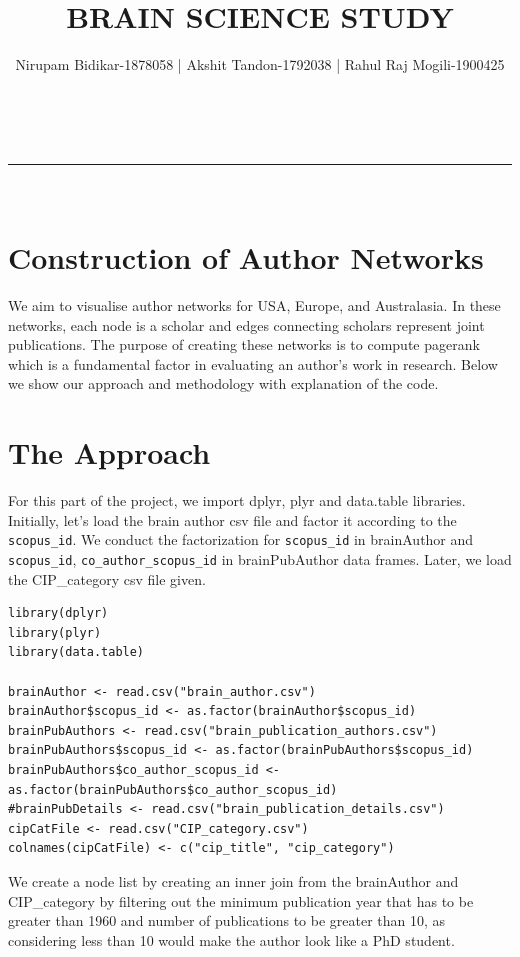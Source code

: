 \documentclass[a4paper,11pt]{article}
\makeatletter
\newcommand{\linia}{\rule{\linewidth}{0.5pt}}
\theoremstyle{mytheor}
\renewcommand{\maketitle}{
\begin{center}
\vspace{2ex}
{\huge \textsc{\@title}}
\vspace{1ex}
\\
\linia\\
\@author \hfill
\vspace{4ex}
\end{center}
}
\makeatother
\begin{document}
\title{\textbf{{BRAIN SCIENCE STUDY}}}


\author{Nirupam Bidikar-1878058 | Akshit Tandon-1792038 | Rahul Raj Mogili-1900425}


\maketitle

\section*{Construction of Author Networks}

We aim to visualise author networks for USA, Europe, and Australasia. In these networks, each node is a scholar and edges connecting scholars represent joint publications. The purpose of creating these networks is to compute pagerank which is a fundamental factor in evaluating an author's work in research. Below we show our approach and methodology with explanation of the code.

\section*{The Approach}

For this part of the project, we import dplyr, plyr and data.table libraries. Initially, let's load the brain author csv file and factor it according to the \texttt{scopus\_id}. We conduct the factorization for \texttt{scopus\_id} in brainAuthor and \texttt{scopus\_id}, \texttt{co\_author\_scopus\_id} in brainPubAuthor data frames. Later, we load the CIP\_category csv file given. \newline

\begin{lstlisting}
library(dplyr)
library(plyr)
library(data.table)

brainAuthor <- read.csv("brain_author.csv")
brainAuthor$scopus_id <- as.factor(brainAuthor$scopus_id)
brainPubAuthors <- read.csv("brain_publication_authors.csv")
brainPubAuthors$scopus_id <- as.factor(brainPubAuthors$scopus_id)
brainPubAuthors$co_author_scopus_id <- as.factor(brainPubAuthors$co_author_scopus_id)
#brainPubDetails <- read.csv("brain_publication_details.csv")
cipCatFile <- read.csv("CIP_category.csv")
colnames(cipCatFile) <- c("cip_title", "cip_category")
\end{lstlisting}

We create a node list by creating an inner join from the brainAuthor and CIP\_category by filtering out the minimum publication year that has to be greater than 1960 and number of publications to be greater than 10, as considering less than 10 would make the author look like a PhD student.\newline
\end{document}
